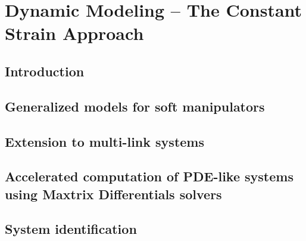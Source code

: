 \chapter[Dynamic modeling of Soft Robots -- PCC case]{Dynamic Modeling -- The  Constant Strain Approach}
\label{chap: chapter 1}




\section{Introduction}
\label{sec: chap1 1_introduction}


\cleardoublepage
\section{Generalized models for soft manipulators}
\label{sec: chap2 section header}


\section{Extension to multi-link systems}
\label{sec: chap2 section header}


\clearpage
\section[Accelerated computation of PDE-like systems]{Accelerated computation of PDE-like systems using Maxtrix Differentials solvers}
\label{sec: chap2 section header}


\clearpage
\section{System identification}
\label{sec: chap2 section header}



